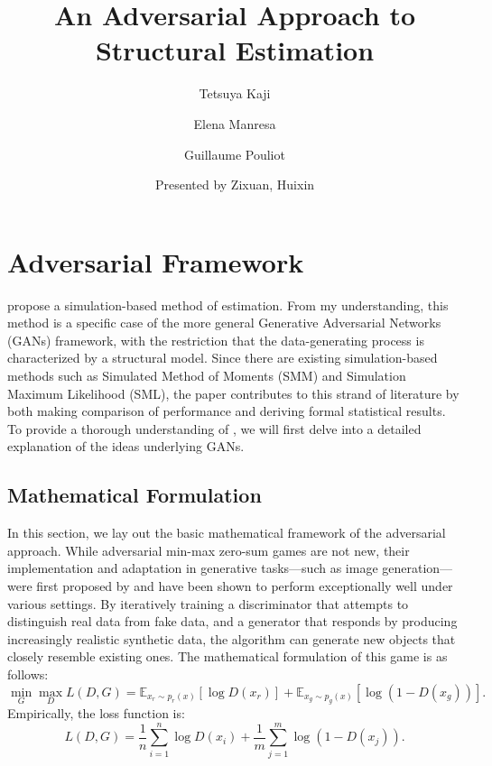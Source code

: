 \documentclass[12pt]{article}
\title{\textbf{An Adversarial Approach to Structural Estimation}}
\author{Tetsuya Kaji \and Elena Manresa \and Guillaume Pouliot}
\date{Presented by Zixuan, Huixin}
\begin{document}
\maketitle




\section{Adversarial Framework} \label{sec:framework}

\citet{kaji2023adversarial} propose a simulation-based method of estimation. From my understanding, this method is a specific case of the more general Generative Adversarial Networks (GANs) framework, with the restriction that the data-generating process is characterized by a structural model. Since there are existing simulation-based methods such as Simulated Method of Moments (SMM) and Simulation Maximum Likelihood (SML), the paper contributes to this strand of literature by both making comparison of performance and deriving formal statistical results. To provide a thorough understanding of \citet{kaji2023adversarial}, we will first delve into a detailed explanation of the ideas underlying GANs.

\subsection{Mathematical Formulation} \label{subsec:math_formulation}
In this section, we lay out the basic mathematical framework of the adversarial
approach. While adversarial min-max zero-sum games are not new, their
implementation and adaptation in generative tasks—such as image generation—were
first proposed by \citet{goodfellow2014generative} and have been shown to
perform exceptionally well under various settings. By iteratively training a
discriminator that attempts to distinguish real data from fake data, and a
generator that responds by producing increasingly realistic synthetic data, the
algorithm can generate new objects that closely resemble existing ones. The
mathematical formulation of this game is as follows:
\begin{equation} \label{eq:gan_objective}
    \min_G \max_D L(D, G)
    = \mathbb{E}_{x_r \sim p_{r}(x)} [\log D(x_r)] + \mathbb{E}_{x_g \sim p_g(x)} [\log(1 - D(x_g))].
\end{equation}
Empirically, the loss function is:
\begin{equation}\label{eq:empirical_loss}
    L(D, G) = \frac{1}{n} \sum_{i=1}^n \log D(x_i) + \frac{1}{m} \sum_{j=1}^m \log (1-D(x_j)).
\end{equation}
\end{document}
